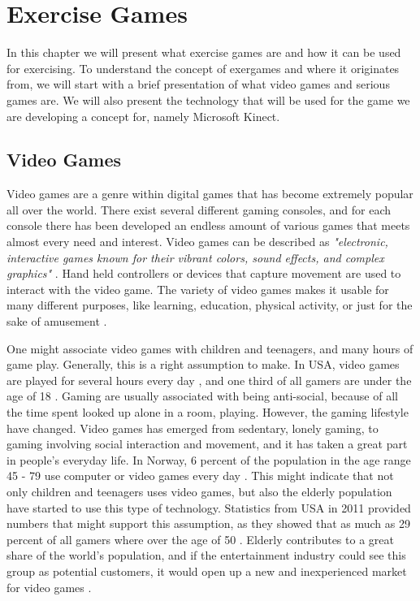 \chapter{Exercise Games}
In this chapter we will present what exercise games are and how it can be used for exercising. To understand the concept of exergames and where it originates from, we will start with a brief presentation of what video games and serious games are. We will also present the technology that will be used for the game we are developing a concept for, namely Microsoft Kinect. 

\section{Video Games}

Video games are a genre within digital games that has become extremely popular all over the world. There exist several different gaming consoles, and for each console there has been developed an endless amount of various games that meets almost every need and interest. Video games can be described as \emph{"electronic, interactive games known for their vibrant colors, sound effects, and complex graphics"} \cite{videogamedef}. Hand held controllers or devices that capture movement are used to interact with the video game. The variety of video games makes it usable for many different purposes, like learning, education, physical activity, or just for the sake of amusement \cite{project}. 

One might associate video games with children and teenagers, and many hours of game play. Generally, this is a right assumption to make. In USA, video games are played for several hours every day \cite{foxnews}, and one third of all gamers are under the age of 18 \cite{videogames2012}. Gaming are usually associated with being anti-social, because of all the time spent looked up alone in a room, playing. However, the gaming lifestyle have changed. Video games has emerged from sedentary, lonely gaming, to gaming involving social interaction and movement, and it has taken a great part in people's everyday life. In Norway, 6 percent of the population in the age range 45 - 79 use computer or video games every day \cite{mediebarometer2012}. This might indicate that not only children and teenagers uses video games, but also the elderly population have started to use this type of technology. Statistics from USA in 2011 provided numbers that might support this assumption, as they showed that as much as 29 percent of all gamers where over the age of 50 \cite{videogames2011}. Elderly contributes to a great share of the world's population, and if the entertainment industry could see this group as potential customers, it would open up a new and inexperienced market for video games \cite{ijsselsteijn2007digital}. 

